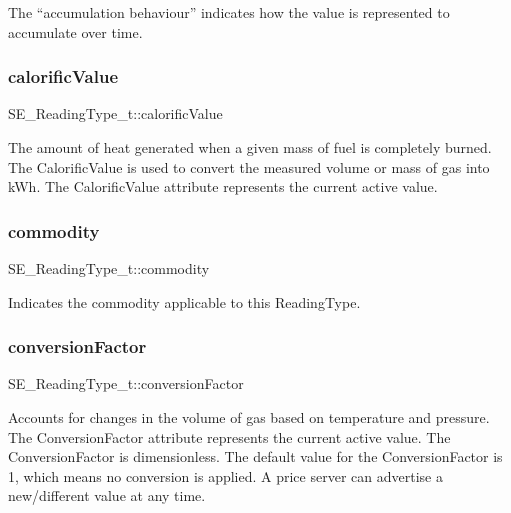 The “accumulation behaviour” indicates how the value is represented to accumulate over time. \mbox{\label{group__ReadingType_ga57e12f39f9ed0fcdb2a9b83dab5b3e2f}} 
\subsubsection{\texorpdfstring{calorific\+Value}{calorificValue}}
{\footnotesize\ttfamily S\+E\+\_\+\+Reading\+Type\+\_\+t\+::calorific\+Value}

The amount of heat generated when a given mass of fuel is completely burned. The Calorific\+Value is used to convert the measured volume or mass of gas into k\+Wh. The Calorific\+Value attribute represents the current active value. \mbox{\label{group__ReadingType_gac70ce0c79f4a38a96aa90aa1843907c1}} 
\subsubsection{\texorpdfstring{commodity}{commodity}}
{\footnotesize\ttfamily S\+E\+\_\+\+Reading\+Type\+\_\+t\+::commodity}

Indicates the commodity applicable to this Reading\+Type. \mbox{\label{group__ReadingType_ga479e0031bba268429db70bbcb9f4ef2d}} 
\subsubsection{\texorpdfstring{conversion\+Factor}{conversionFactor}}
{\footnotesize\ttfamily S\+E\+\_\+\+Reading\+Type\+\_\+t\+::conversion\+Factor}

Accounts for changes in the volume of gas based on temperature and pressure. The Conversion\+Factor attribute represents the current active value. The Conversion\+Factor is dimensionless. The default value for the Conversion\+Factor is 1, which means no conversion is applied. A price server can advertise a new/different value at any time. \mbox{\label{group__ReadingType_gac7db2fdae63614e7fd7e738071012fa7}} 
